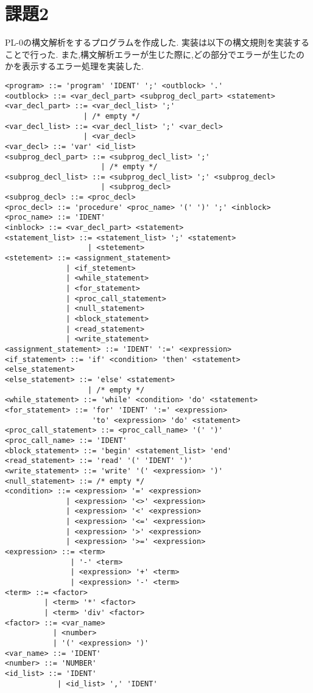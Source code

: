 \documentclass[main]{subfiles}
\begin{document}
\section{課題2}
PL-0の構文解析をするプログラムを作成した.
実装は以下の構文規則を実装することで行った.
また,構文解析エラーが生じた際に,どの部分でエラーが生じたのかを表示するエラー処理を実装した.
\begin{oframed}
\begin{verbatim}
<program> ::= 'program' 'IDENT' ';' <outblock> '.'
<outblock> ::= <var_decl_part> <subprog_decl_part> <statement>
<var_decl_part> ::= <var_decl_list> ';'
                  | /* empty */
<var_decl_list> ::= <var_decl_list> ';' <var_decl>
                  | <var_decl>
<var_decl> ::= 'var' <id_list>
<subprog_decl_part> ::= <subprog_decl_list> ';'
                      | /* empty */
<subprog_decl_list> ::= <subprog_decl_list> ';' <subprog_decl>
                      | <subprog_decl>
<subprog_decl> ::= <proc_decl>
<proc_decl> ::= 'procedure' <proc_name> '(' ')' ';' <inblock>
<proc_name> ::= 'IDENT'
<inblock> ::= <var_decl_part> <statement>
<statement_list> ::= <statement_list> ';' <statement>
                   | <stetement>
<stetement> ::= <assignment_statement>
              | <if_stetement>
              | <while_statement>
              | <for_statement>
              | <proc_call_statement>
              | <null_statement>
              | <block_statement>
              | <read_statement>
              | <write_statement>
<assignment_statement> ::= 'IDENT' ':=' <expression>
<if_statement> ::= 'if' <condition> 'then' <statement> <else_statement>
<else_statement> ::= 'else' <statement>
                   | /* empty */
<while_statement> ::= 'while' <condition> 'do' <statement>
<for_statement> ::= 'for' 'IDENT' ':=' <expression> 
                    'to' <expression> 'do' <statement>
<proc_call_statement> ::= <proc_call_name> '(' ')'
<proc_call_name> ::= 'IDENT'
<block_statement> ::= 'begin' <statement_list> 'end'
<read_statement> ::= 'read' '(' 'IDENT' ')'
<write_statement> ::= 'write' '(' <expression> ')'
<null_statement> ::= /* empty */
<condition> ::= <expression> '=' <expression>
              | <expression> '<>' <expression>
              | <expression> '<' <expression>
              | <expression> '<=' <expression>
              | <expression> '>' <expression>
              | <expression> '>=' <expression>
<expression> ::= <term>
               | '-' <term>
               | <expression> '+' <term>
               | <expression> '-' <term>
<term> ::= <factor>
         | <term> '*' <factor>
         | <term> 'div' <factor>
<factor> ::= <var_name>
           | <number>
           | '(' <expression> ')'
<var_name> ::= 'IDENT'
<number> ::= 'NUMBER'
<id_list> ::= 'IDENT'
            | <id_list> ',' 'IDENT'
\end{verbatim}
\end{oframed}
\end{document}
